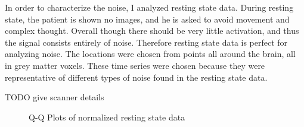 In order to characterize the noise, I analyzed resting state data.
During resting state, the patient is shown no images, and he is asked
to avoid movement and complex thought.  Overall though there should be 
very little activation, and thus the signal consists entirely of noise. 
Therefore resting state data is perfect for analyzing noise. 
The locations were chosen from points all around the brain, 
all in grey matter voxels. These time
series were chosen because they were representative of different types
of noise found in the resting state data.

TODO give scanner details

\begin{figure}
\centering
{}


\caption{Q-Q Plots of normalized resting state data}
\label{fig:QQDC}
\end{figure}

